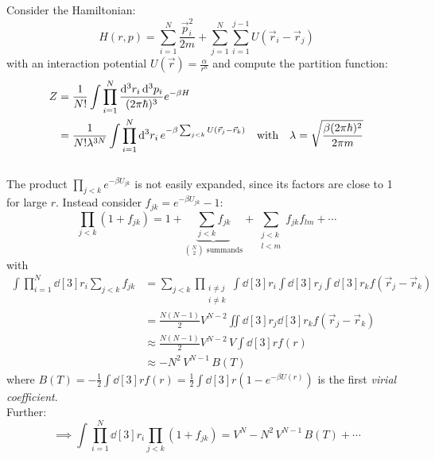 \documentclass[11pt,a4paper]{scrartcl}
\begin{document}
\section{}

Consider the Hamiltonian:
\begin{equation*}
    H(r,p)=\sum_{i=1}^{N}\frac{\vec{p}_{i}^{2}}{2m}+\sum_{j=1}^{N}\sum_{i=1}^{j-1}U(\vec{r}_{i}-\vec{r}_{j})
\end{equation*}
with an interaction potential $U(\vec{r})=\frac{\alpha}{r^n}$
and compute the partition function:
\begin{align*}
    Z&=\frac{1}{N!}\int\prod_{i=1}^{N}\frac{\dd[3]{r_i}\dd[3]{p_i}}{(2\pi\hbar)^3}e^{-\beta H}
    \\
    &=\frac{1}{N!\lambda^{3N}}\int\prod_{i=1}^{N}\dd[3]{r_i}e^{-\beta\sum_{j<k}U(\vec{r}_{j}-\vec{r}_{k})}
    \qq{with}\lambda=\sqrt{\frac{\beta(2\pi\hbar)^2}{2\pi{m}}}
\end{align*} \\

The product $\displaystyle\prod_{j<k}e^{-\beta U_{jk}}$ is not easily expanded,
since its factors are close to 1 for large $r$. Instead consider
$f_{jk}=e^{-\beta U_{jk}}-1$:
\begin{equation*}
    \prod_{j<k}(1+f_{jk})=1+
    \underbrace{\sum_{j<k}f_{jk}}_{\binom{N}{2}\text{ summands}}
    +\sum_{\substack{j<k\\l<m}}f_{jk}f_{lm}+\dotsb
\end{equation*}
with
\begin{align*}
    \int\prod_{i=1}^{N}\dd[3]{r_i}\sum_{j<k}f_{jk}
    &=\sum_{j<k}\prod_{\substack{i\ne{j}\\i\ne{k}}}
    \int\dd[3]{r_i}\int\dd[3]{r_j}\int\dd[3]{r_k}f(\vec{r}_{j}-\vec{r}_{k}) \\
    &=\frac{N(N-1)}{2}V^{N-2}\iint\dd[3]{r_j}\dd[3]{r_k}f(\vec{r}_{j}-\vec{r}_{k})
    \\
    &\approx\frac{N(N-1)}{2}V^{N-2}\,V\int\dd[3]{r}f(r) \\
    &\approx-N^2\,V^{N-1}\,B(T)
\end{align*}
where $\displaystyle B(T)=-\frac{1}{2}\int\dd[3]{r}f(r)=
\frac{1}{2}\int\dd[3]{r}\left(1-e^{-\beta U(r)}\right)$ is the first
\emph{virial coefficient}. \\
Further:
\begin{equation*}
    \implies\int\prod_{i=1}^{N}\dd[3]{r_i}\prod_{j<k}(1+f_{jk})
    =V^N-N^2\,V^{N-1}\,B(T)+\dotsb
\end{equation*} \\
\end{document}
